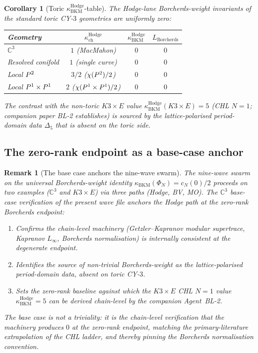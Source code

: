 \documentclass[11pt]{article}
\newtheorem{corollary}[theorem]{Corollary}
\newtheorem{remark}[theorem]{Remark}
\providecommand{\C}{\mathbb{C}}
\providecommand{\kBKM}{\kappa_{\mathrm{BKM}}}
\providecommand{\kch}{\kappa_{\mathrm{ch}}}
\begin{document}
\begin{corollary}[Toric $\kBKM^{\mathrm{Hodge}}$-table]
\label{cor:bl1-toric-kbkm-table}
The Hodge-lane Borcherds-weight invariants of the standard toric CY-$3$
geometries are uniformly zero:
\begin{center}
\begin{tabular}{lccc}
\hline
Geometry & $\kch^{\mathrm{Hodge}}$ & $\kBKM^{\mathrm{Hodge}}$ & $L_{\mathrm{Borcherds}}$ \\
\hline
$\C^3$ & $1$ (MacMahon) & $0$ & $0$ \\
Resolved conifold & $1$ (single curve) & $0$ & $0$ \\
Local $P^2$ & $3/2$ ($\chi(P^2)/2$) & $0$ & $0$ \\
Local $P^1 \times P^1$ & $2$ ($\chi(P^1 \times P^1)/2$) & $0$ & $0$ \\
\hline
\end{tabular}
\end{center}
The contrast with the non-toric $K3 \times E$ value
$\kBKM^{\mathrm{Hodge}}(K3 \times E) = 5$ (CHL $N = 1$; companion
paper BL-2 establishes) is sourced by the lattice-polarised
period-domain data $\Delta_5$ that is absent on the toric side.
\end{corollary}

\subsection{The zero-rank endpoint as a base-case anchor}
\label{subsec:bl1-zero-rank-anchor}

\begin{remark}[The base case anchors the nine-wave swarm]
\label{rem:bl1-base-case-anchors-swarm}
The nine-wave swarm on the universal Borcherds-weight identity
$\kBKM(\Phi_N) = c_N(0)/2$ proceeds on two examples ($\C^3$ and
$K3 \times E$) via three paths (Hodge, BV, MO). The $\C^3$ base-case
verification of the present wave file anchors the Hodge path at the
zero-rank Borcherds endpoint:
\begin{enumerate}[label=(\alph*)]
  \item Confirms the chain-level machinery (Getzler--Kapranov modular
    supertrace, Kapranov $L_\infty$, Borcherds normalisation) is
    internally consistent at the degenerate endpoint.
  \item Identifies the source of non-trivial Borcherds-weight as the
    lattice-polarised period-domain data, absent on toric CY-$3$.
  \item Sets the zero-rank baseline against which the $K3 \times E$
    CHL $N = 1$ value $\kBKM^{\mathrm{Hodge}} = 5$ can be derived
    chain-level by the companion Agent~BL-2.
\end{enumerate}
The base case is not a triviality: it is the chain-level verification
that the machinery produces $0$ at the zero-rank endpoint, matching
the primary-literature extrapolation of the CHL ladder, and thereby
pinning the Borcherds normalisation convention.
\end{remark}
\end{document}
